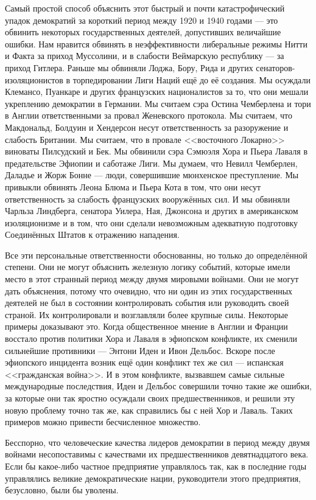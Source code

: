 Самый простой способ объяснить этот быстрый и почти катастрофический упадок демократий за короткий период между 1920 и 1940 годами — это обвинить некоторых государственных деятелей, допустивших величайшие ошибки. Нам нравится обвинять в неэффективности либеральные режимы Нитти и Факта за приход Муссолини, и в слабости Веймарскую республику — за приход Гитлера. Раньше мы обвиняли Лоджа, Бору, Рида и других сенаторов-изоляционистов в торпедировании Лиги Наций ещё до её создания. Мы осуждали Клемансо, Пуанкаре и других французских националистов за то, что они мешали укреплению демократии в Германии. Мы считаем сэра Остина Чемберлена и тори в Англии ответственными за провал Женевского протокола. Мы считаем, что Макдональд, Болдуин и Хендерсон несут ответственность за разоружение и слабость Британии. Мы считаем, что в провале <<восточного Локарно>> виноваты Пилсудский и Бек. Мы обвинили сэра Сэмюэля Хора и Пьера Лаваля в предательстве Эфиопии и саботаже Лиги. Мы думаем, что Невилл Чемберлен, Даладье и Жорж Бонне — люди, совершившие мюнхенское преступление. Мы привыкли обвинять Леона Блюма и Пьера Кота в том, что они несут ответственность за слабость французских вооружённых сил. И мы обвиняли Чарльза Линдберга, сенатора Уилера, Ная, Джонсона и других в американском изоляционизме и в том, что они сделали невозможным адекватную подготовку Соединённых Штатов к отражению нападения.

Все эти персональные ответственности обоснованны, но только до определённой степени. Они не могут объяснить железную логику событий, которые имели место в этот странный период между двумя мировыми войнами. Они не могут дать объяснения, потому что очевидно, что ни один из этих государственных деятелей не был в состоянии контролировать события или руководить своей страной. Их контролировали и возглавляли более крупные силы. Некоторые примеры доказывают это. Когда общественное мнение в Англии и Франции восстало против политики Хора и Лаваля в эфиопском конфликте, их сменили сильнейшие противники — Энтони Иден и Ивон Дельбос. Вскоре после эфиопского инцидента возник ещё один конфликт тех же сил — испанская <<гражданская война>>. И в этом конфликте, вызвавшем самые сильные международные последствия, Иден и Дельбос совершили точно такие же ошибки, за которые они так яростно осуждали своих предшественников, и решили эту новую проблему точно так же, как справились бы с ней Хор и Лаваль. Таких примеров можно привести бесчисленное множество.

Бесспорно, что человеческие качества лидеров демократии в период между двумя войнами несопоставимы с качествами их предшественников девятнадцатого века. Если бы какое-либо частное предприятие управлялось так, как в последние годы управлялись великие демократические нации, руководители этого предприятия, безусловно, были бы уволены.

